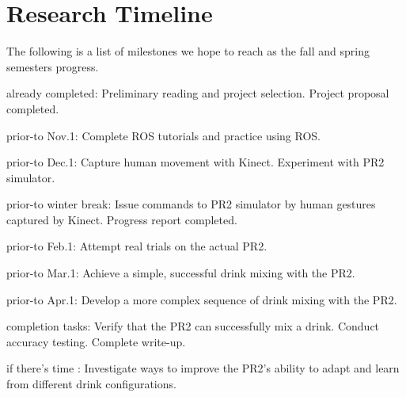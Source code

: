 \documentclass{sig-alternate}
\begin{document}
\section{Research Timeline}
\label{sec:research_timeline}
The following is a list of milestones we hope to reach as the fall and spring semesters progress.

\begin{itemize*}
	\item {\sc already completed}: Preliminary reading and project selection. Project proposal completed.\vspace{3pt}
	\item {\sc prior-to Nov.1}: Complete ROS tutorials and practice using ROS.\vspace{3pt}
	\item {\sc prior-to Dec.1}: Capture human movement with Kinect. Experiment with PR2 simulator.\vspace{3pt}
	\item {\sc prior-to winter break}: Issue commands to PR2 simulator by human gestures captured by Kinect. Progress report completed.\vspace{3pt}
	\item {\sc prior-to Feb.1}: Attempt real trials on the actual PR2.\vspace{3pt}
	\item {\sc prior-to Mar.1}: Achieve a simple, successful drink mixing with the PR2.\vspace{3pt}
	\item {\sc prior-to Apr.1}: Develop a more complex sequence of drink mixing with the PR2.\vspace{3pt}
	\item {\sc completion tasks}: Verify that the PR2 can successfully mix a drink. Conduct accuracy testing. Complete write-up.\vspace{3pt}
	\item {\sc if there's time} : Investigate ways to improve the PR2's ability to adapt and learn from different drink configurations.
\end{itemize*}

\end{document}
